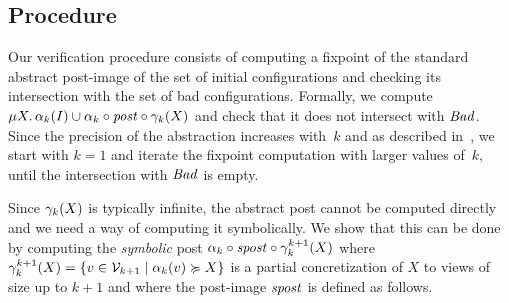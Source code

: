 %

\subsection{Procedure}
\label{section:procedure}
%
Our verification procedure consists of computing a fixpoint of the
standard abstract post-image of the set of initial configurations and
checking its intersection with the set of bad configurations.
%
Formally, we compute $\mu X.\, \alpha_{k}(I) \cup \alpha_{k}\circ
\mathit{post} \circ \gamma_{k}(X)$ and check that it does not intersect with
$\mathit{Bad}$.
%
Since the precision of the abstraction increases with~$k$ and as
described in~\cite{AbHaHo:view:abstraction}, we start with $k = 1$ and
iterate the fixpoint computation with larger values of~$k$, until the
intersection with $\mathit{Bad}$ is empty.
%

%
Since $\gamma_{k}(X)$ is typically infinite, the abstract post
cannot be computed directly and we need a way of computing it
symbolically. %
We show %
that this can be done by computing the \emph{symbolic} post $\alpha_{k}\circ
\mathit{spost} \circ \gamma_{k}^{k+1}(X)$ where %
$\gamma_{k}^{k+1}(X) = \{{v\in \mathcal{V}_{k+1}}\mathrel{}\mid\mathrel{}{\alpha_{k}(v)\succcurlyeq X}\}$ is a partial concretization of $X$ to views of
size up to $k+1$ and where the post-image $\mathit{spost}$ is
defined as follows.

